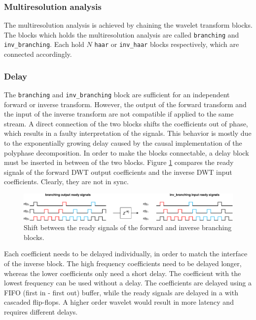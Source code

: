 \begin{refsection}
\subsubsection{Multiresolution analysis}

The multiresolution analysis is achieved by chaining the wavelet transform blocks.
The blocks which holds the multiresolution analysis are called \texttt{branching} and \texttt{inv\_branching}.
Each hold $N$ \texttt{haar} or \texttt{inv\_haar} blocks respectively, which are connected accordingly.

\subsubsection{Delay \label{fpga:sec:delay}}

The \texttt{branching} and \texttt{inv\_branching} block are sufficient for an independent forward or inverse transform.
However, the output of the forward transform and the input of the inverse transform are not compatible if applied to the same stream.
A direct connection of the two blocks shifts the coefficients out of phase, which results in a faulty interpretation of the signals.
This behavior is mostly due to the exponentially growing delay caused by the causal implementation of the polyphase decomposition.
In order to make the blocks connectable, a delay block must be inserted in between of the two blocks.
Figure \ref{fpga:fig:delay} compares the ready signals of the forward DWT output coefficients and the inverse DWT input coefficients.
Clearly, they are not in sync.
\begin{figure}
	\centering
	\includegraphics[width=\hsize]{papers/fpga/images/delay.pdf}
	\caption{
		Shift between the ready signals of the forward and inverse branching blocks.
	}
	\label{fpga:fig:delay}
\end{figure}
Each coefficient needs to be delayed individually, in order to match the interface of the inverse block.
The high frequency coefficients need to be delayed longer, whereas the lower coefficients only need a short delay.
The coefficient with the lowest frequency can be used without a delay.
The coefficients are delayed using a FIFO (first in - first out) buffer, while the ready signals are delayed in a with cascaded flip-flops.
A higher order wavelet would result in more latency and requires different delays. 


\end{refsection}
